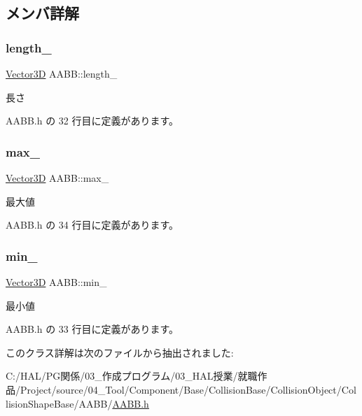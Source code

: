 \subsection{メンバ詳解}
\mbox{\label{class_a_a_b_b_abade307dbbfa9c74638fde5387d629f8}} 
\subsubsection{\texorpdfstring{length\+\_\+}{length\_}}
{\footnotesize\ttfamily \mbox{\hyperlink{class_vector3_d}{Vector3D}} A\+A\+B\+B\+::length\+\_\+\hspace{0.3cm}{\ttfamily [private]}}



長さ 



 A\+A\+B\+B.\+h の 32 行目に定義があります。

\mbox{\label{class_a_a_b_b_a7f8dca79cab056729bde7139b219fcbe}} 
\subsubsection{\texorpdfstring{max\+\_\+}{max\_}}
{\footnotesize\ttfamily \mbox{\hyperlink{class_vector3_d}{Vector3D}} A\+A\+B\+B\+::max\+\_\+\hspace{0.3cm}{\ttfamily [private]}}



最大値 



 A\+A\+B\+B.\+h の 34 行目に定義があります。

\mbox{\label{class_a_a_b_b_a682f7bc02fc950a24ce8a8e512e4eb52}} 
\subsubsection{\texorpdfstring{min\+\_\+}{min\_}}
{\footnotesize\ttfamily \mbox{\hyperlink{class_vector3_d}{Vector3D}} A\+A\+B\+B\+::min\+\_\+\hspace{0.3cm}{\ttfamily [private]}}



最小値 



 A\+A\+B\+B.\+h の 33 行目に定義があります。



このクラス詳解は次のファイルから抽出されました\+:\begin{DoxyCompactItemize}
\item 
C\+:/\+H\+A\+L/\+P\+G関係/03\+\_\+作成プログラム/03\+\_\+\+H\+A\+L授業/就職作品/\+Project/source/04\+\_\+\+Tool/\+Component/\+Base/\+Collision\+Base/\+Collision\+Object/\+Collision\+Shape\+Base/\+A\+A\+B\+B/\mbox{\hyperlink{_a_a_b_b_8h}{A\+A\+B\+B.\+h}}\end{DoxyCompactItemize}
